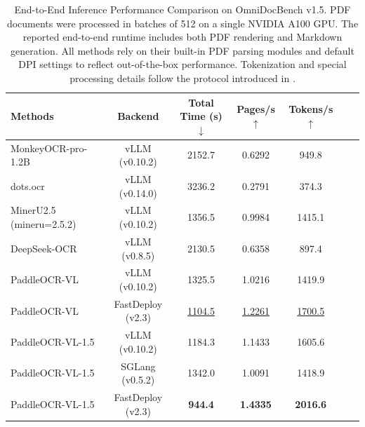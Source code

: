 \documentclass[11pt, a4paper,logo,  copyright, nonumbering]{paddleocr}
\begin{document}
\begin{table}[H]
  \centering
  \fontsize{8}{8}\selectfont
  \renewcommand{\arraystretch}{1.2}
  \begin{tabular}{l|cccccc}
    \toprule
    \textbf{Methods} & \textbf{Backend} & \textbf{Total Time (s)$\downarrow$} & \textbf{Pages/s$\uparrow$} & \textbf{Tokens/s$\uparrow$} 
    \\
    \midrule
    MonkeyOCR-pro-1.2B~\cite{li2025monkeyocr}& vLLM (v0.10.2) & 2152.7 & 0.6292 & 949.8 & 
    \\
    dots.ocr~\cite{dotsocr} & vLLM (v0.14.0)& 3236.2 & 0.2791 & 374.3 & 
    \\
    MinerU2.5 (mineru=2.5.2)~\cite{niu2025mineru2} & vLLM (v0.10.2)& 1356.5 & 0.9984 & 1415.1 & 
    \\
    DeepSeek-OCR~\cite{wei2025deepseek} & vLLM (v0.8.5)& 2130.5 & 0.6358 & 897.4 & 
    \\
    PaddleOCR-VL & vLLM (v0.10.2) & 1325.5 & 1.0216 & 1419.9 & 
    \\
    PaddleOCR-VL & FastDeploy (v2.3) & \cellcolor{cyan!15}\underline{1104.5} & \cellcolor{cyan!15}\underline{1.2261} & \cellcolor{cyan!15}\underline{1700.5} & 
    \\
    PaddleOCR-VL-1.5 & vLLM (v0.10.2) & 1184.3 & 1.1433 & 1605.6 & 
    \\
    PaddleOCR-VL-1.5 & SGLang (v0.5.2)& 1342.0 & 1.0091 & 1418.9 & 
    \\
    PaddleOCR-VL-1.5 & FastDeploy (v2.3) & \cellcolor{red!15}\textbf{944.4} & \cellcolor{red!15}\textbf{1.4335} & \cellcolor{red!15}\textbf{2016.6} & 
    \\
    \bottomrule
  \end{tabular}
  \caption{
    End-to-End Inference Performance Comparison on OmniDocBench v1.5. PDF documents were processed in batches of 512 on a single NVIDIA A100 GPU. The reported end-to-end runtime includes both PDF rendering and Markdown generation. All methods rely on their built-in PDF parsing modules and default DPI settings to reflect out-of-the-box performance. Tokenization and special processing details follow the protocol introduced in \cite{cui2025paddleocrvl}.
  }
  \label{tab:inference_performance}
\end{table}
\end{document}
